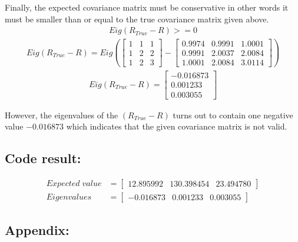 \documentclass[a4paper]{article}
\begin{document}
Finally, the expected covariance matrix must be conservative in other words it must be smaller than or equal to the 
true covariance matrix given above.
\begin{align*}
\boxed{Eig(R_{True} - R) >= 0}
\end{align*}
\begin{align*}
Eig(R_{True} - R) = Eig\left(
	\begin{bmatrix}
		1 & 1 & 1 \\ 
		1 & 2 & 2 \\
		1 & 2 & 3
	\end{bmatrix}
	-
	\begin{bmatrix}
		0.9974  &  0.9991  &  1.0001 \\
    	0.9991  &  2.0037  &  2.0084 \\
    	1.0001  &  2.0084  &  3.0114
	\end{bmatrix}
\right)
\end{align*}
\begin{align*}
Eig(R_{True} - R) =
	\begin{bmatrix}
		-0.016873 \\
		0.001233 \\
		0.003055		
	\end{bmatrix}
\end{align*}

However, the eigenvalues of the $(R_{True} - R)$ turns out to contain one negative value $-0.016873$ 
which indicates that the given covariance matrix is not valid.

\subsection*{Code result:}
\begin{align*}
	Expected \; value &= 
	\begin{bmatrix}
		12.895992 & 130.398454 & 23.494780
	\end{bmatrix} \\
	Eigenvalues &= 
	\begin{bmatrix}
		-0.016873 & 0.001233 & 0.003055
	\end{bmatrix}
\end{align*}

\newpage
\subsection*{Appendix:}

\end{document}
